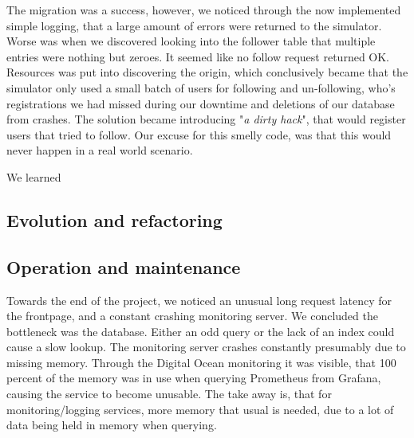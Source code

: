 The migration was a success, however, we noticed through the now implemented simple logging, that a large amount of errors were returned to the simulator\cite{issue112}. Worse was when we discovered looking into the follower table that multiple entries were nothing but zeroes. It seemed like no follow request returned OK. Resources was put into discovering the origin, which conclusively became that the simulator only used a small batch of users for following and un-following, who's registrations we had missed during our downtime and deletions of our database from crashes. The solution became introducing "\textit{a dirty hack}", that would register users that tried to follow. Our excuse for this smelly code, was that this would never happen in a real world scenario.

We learned 

\subsection{Evolution and refactoring}

\subsection{Operation and maintenance}
Towards the end of the project, we noticed an unusual long request latency for the frontpage, and a constant crashing monitoring server. We concluded the bottleneck was the database\cite{issue182}. Either an odd query or the lack of an index could cause a slow lookup. The monitoring server crashes constantly presumably due to missing memory. Through the Digital Ocean monitoring it was visible, that 100 percent of the memory was in use when querying Prometheus from Grafana\cite{issue183}, causing the service to become unusable. The take away is, that for monitoring/logging services, more memory that usual is needed, due to a lot of data being held in memory when querying.

